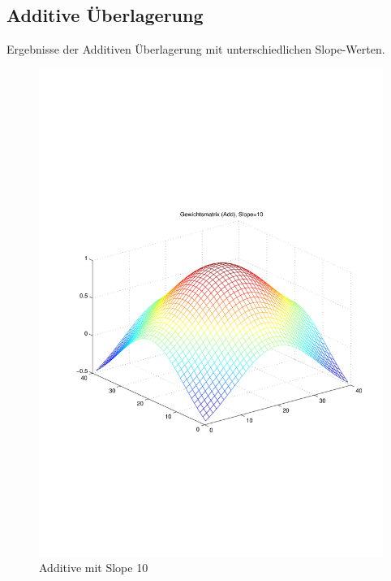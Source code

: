 \subsection{Additive Überlagerung}
Ergebnisse der Additiven Überlagerung mit unterschiedlichen Slope-Werten.
\begin{figure}[hbt]
	\begin{minipage}{0.48\textwidth}
		\includegraphics[trim=70 200 32 242, clip, width=\textwidth]{./Bilder/Auswertung/Gewichtsmatrix/Gewichtsmatrix_Add_Slope_10}
		\caption{Additive mit Slope 10}
		\label{Add10}
	\end{minipage}
	\hfill
	\begin{minipage}{0.48\textwidth}

\end{minipage}
\end{figure}
